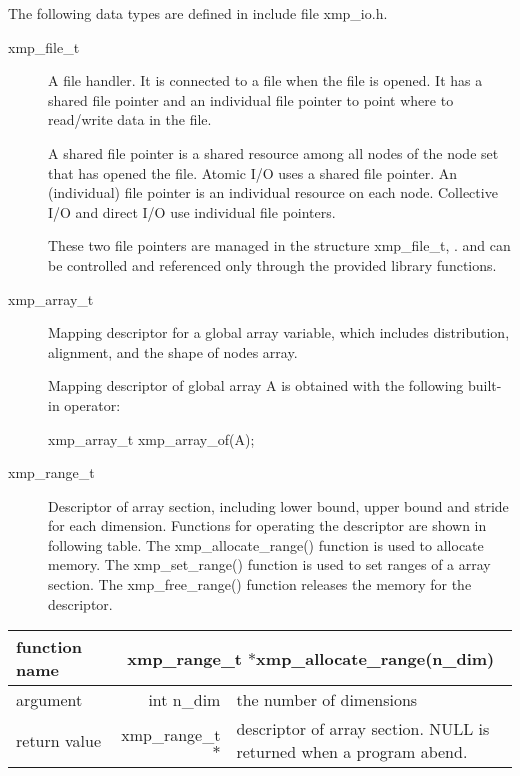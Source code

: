    The following data types are defined in include file xmp\_io.h.
   \begin{description}
    \item[xmp\_file\_t] A file handler.
	       It is connected to a file when the file is opened.
	       It has a shared file pointer and an individual file pointer
	       to point where to read/write data in the file.

	       A shared file pointer is a shared resource among all nodes of the node set
             that has opened the file. Atomic I/O uses a shared file pointer.
	       An (individual) file pointer is an individual resource on each node. 
	       Collective I/O and direct I/O use individual file pointers.
	       
	       These two file pointers are managed in the structure xmp\_file\_t, .
	       and can be controlled and referenced only through
	       the provided library functions.
    \item[xmp\_array\_t] Mapping descriptor for a global array variable,
	       which includes distribution, alignment, and the shape of nodes array.

	       Mapping descriptor of global array A is obtained with
	       the following built-in operator:
	       
	       xmp\_array\_t xmp\_array\_of(A);
\fi
\clearpage
    \item[xmp\_range\_t] Descriptor of array section, including
      lower bound, upper bound and stride for each dimension.
      Functions for operating the descriptor are shown in following table.
      The xmp\_allocate\_range() function is used to allocate memory.
      The xmp\_set\_range() function is used to set ranges of a array section.
      The xmp\_free\_range() function releases the memory for the descriptor.
   \end{description}

   \begin{table}[h]
    \begin{center}
      \begin{tabular}{|l|r|p{90mm}|}
      \hline
      {\bf function name}  & \multicolumn{2}{c|}{\bf xmp\_range\_t $*$xmp\_allocate\_range(n\_dim)}  \\ \hline \hline
      argument & int n\_dim & the number of dimensions \\ \hline
      return value & xmp\_range\_t$*$ & descriptor of array section. NULL is returned
	      when a program abend. \\ \hline
      \end{tabular}
     \end{center}
    \label{tb:aaa}
   \end{table}

